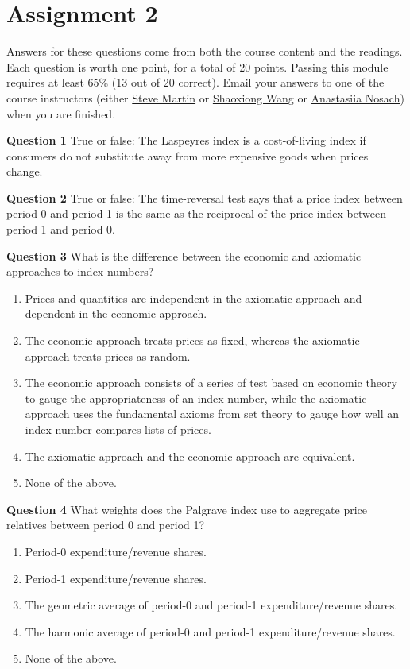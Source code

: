 \documentclass[
]{article}
\begin{document}
\hypertarget{assignment-2}{%
\section{Assignment 2}\label{assignment-2}}

Answers for these questions come from both the course content and the readings. Each question is worth one point, for a total of 20 points. Passing this module requires at least 65\% (13 out of 20 correct). Email your answers to one of the course instructors (either \href{mailto:steve.martin5@canada.ca}{Steve Martin} or \href{mailto:shaoxiong.wang@canada.ca}{Shaoxiong Wang} or \href{mailto:anastasiia.nosach@canada.ca}{Anastasiia Nosach}) when you are finished.

\textbf{Question 1} True or false: The Laspeyres index is a cost-of-living index if consumers do not substitute away from more expensive goods when prices change.

\textbf{Question 2} True or false: The time-reversal test says that a price index between period 0 and period 1 is the same as the reciprocal of the price index between period 1 and period 0.

\textbf{Question 3} What is the difference between the economic and axiomatic approaches to index numbers?

\begin{enumerate}
\def\labelenumi{\alph{enumi})}
\item
  Prices and quantities are independent in the axiomatic approach and dependent in the economic approach.
\item
  The economic approach treats prices as fixed, whereas the axiomatic approach treats prices as random.
\item
  The economic approach consists of a series of test based on economic theory to gauge the appropriateness of an index number, while the axiomatic approach uses the fundamental axioms from set theory to gauge how well an index number compares lists of prices.
\item
  The axiomatic approach and the economic approach are equivalent.
\item
  None of the above.
\end{enumerate}

\textbf{Question 4} What weights does the Palgrave index use to aggregate price relatives between period 0 and period 1?

\begin{enumerate}
\def\labelenumi{\alph{enumi})}
\item
  Period-0 expenditure/revenue shares.
\item
  Period-1 expenditure/revenue shares.
\item
  The geometric average of period-0 and period-1 expenditure/revenue shares.
\item
  The harmonic average of period-0 and period-1 expenditure/revenue shares.
\item
  None of the above.
\end{enumerate}
\end{document}
